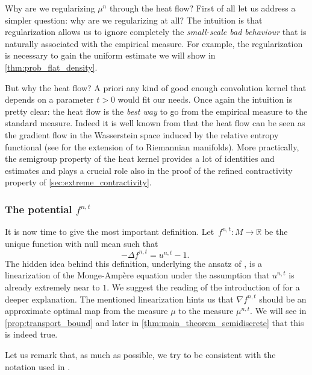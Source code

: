 \documentclass[10pt]{amsart}
\theoremstyle{plain}
\theoremstyle{definition}
\numberwithin{equation}{section}
\newcommand{\RR}{\ensuremath{\mathbb R}}
\newcommand{\lapl}{\ensuremath{\Delta}}
\newcommand{\fullstop}{\ensuremath{\text{. }}}
\begin{document}
Why are we regularizing $\mu^n$ through the heat flow?
First of all let us address a simpler question: why are we
regularizing at all? The intuition is that regularization allows us to ignore completely the
\emph{small-scale bad behaviour} that is naturally associated with the empirical measure.
For example, the regularization is necessary to gain the uniform estimate we will show
in \cref{thm:prob_flat_density}.

But why the heat flow? A priori any kind of good enough convolution kernel that depends on a parameter
$t>0$ would fit our needs. Once again the intuition is pretty clear: the heat flow is the \emph{best way} to
go from the empirical measure to the standard measure. Indeed it is well known from \cite{Jordan-Kinderlehrer-Otto98} that the heat flow can be
seen as the gradient flow in the Wasserstein space induced by the relative entropy functional (see \cite{Erbar2010}
for the extension of \cite{Jordan-Kinderlehrer-Otto98} to Riemannian manifolds). More practically, the semigroup property
of the heat kernel provides a lot of identities
and estimates and plays a crucial role also in the proof of the
refined contractivity property of \cref{sec:extreme_contractivity}.

\subsubsection{The potential $f^{n,t}$}
It is now time to give the most important definition. Let~$f^{n,t}:M\to\RR$ be the unique function with null
mean such that
\begin{equation}\label{eq:definition_f}
-\lapl f^{n,t} = u^{n,t} - 1 \fullstop
\end{equation}
The hidden idea behind this definition, underlying the ansatz of \cite{CaraccioloEtAl2014},
is a linearization of the Monge-Ampère equation under the assumption
that $u^{n,t}$ is already extremely near to $1$. We suggest the reading of the introduction of
\cite{Ambrosio-Stra-Trevisan2018} for a deeper explanation.
The mentioned linearization hints us that $\nabla f^{n,t}$ should be an approximate optimal map from
the measure $\mu$ to the measure $\mu^{n,t}$. We will see in \cref{prop:transport_bound} and later
in \cref{thm:main_theorem_semidiscrete} that this is indeed true.

Let us remark that, as much as possible, we try to be consistent with the notation used in
\cite{Ambrosio-Stra-Trevisan2018}.
\end{document}

